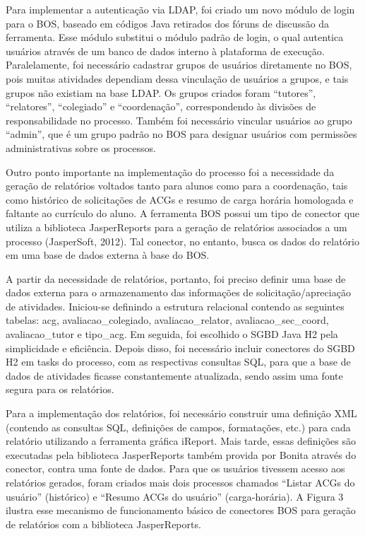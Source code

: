 \documentclass[12pt]{article}
\begin{document}
Para implementar a autenticação via LDAP, foi criado um novo módulo de login para o BOS, baseado em códigos Java retirados dos fóruns de discussão da ferramenta. Esse módulo substitui o módulo padrão de login, o qual autentica usuários através de um banco de dados interno à plataforma de execução. Paralelamente, foi necessário cadastrar grupos de usuários diretamente no BOS, pois muitas atividades dependiam dessa vinculação de usuários a grupos, e tais grupos não existiam na base LDAP. Os grupos criados foram “tutores”, “relatores”, “colegiado” e “coordenação”, correspondendo às divisões de responsabilidade no processo. Também foi necessário vincular usuários ao grupo “admin”, que é um grupo padrão no BOS para designar usuários com permissões administrativas sobre os processos.

Outro ponto importante na implementação do processo foi a necessidade da geração de relatórios voltados tanto para alunos como para a coordenação, tais como histórico de solicitações de ACGs e resumo de carga horária homologada e faltante ao currículo do aluno. A ferramenta BOS possui um tipo de conector que utiliza a biblioteca JasperReports para a geração de relatórios associados a um processo (JasperSoft, 2012). Tal conector, no entanto, busca os dados do relatório em uma base de dados externa à base do BOS.

A partir da necessidade de relatórios, portanto, foi preciso definir uma base de dados externa para o armazenamento das informações de solicitação/apreciação de atividades. Iniciou-se definindo a estrutura relacional contendo as seguintes tabelas: acg, avaliacao\_colegiado, avaliacao\_relator, avaliacao\_sec\_coord, avaliacao\_tutor e tipo\_acg. Em seguida, foi escolhido o SGBD Java H2 pela simplicidade e eficiência. Depois disso, foi necessário incluir conectores do SGBD H2 em tasks do processo, com as respectivas consultas SQL, para que a base de dados de atividades ficasse constantemente atualizada, sendo assim uma fonte segura para os relatórios.

Para a implementação dos relatórios, foi necessário construir uma definição XML (contendo as consultas SQL, definições de campos, formatações, etc.)  para cada relatório utilizando a ferramenta gráfica iReport. Mais tarde, essas definições são executadas pela biblioteca JasperReports também provida por Bonita através do conector, contra uma fonte de dados. Para que os usuários tivessem acesso aos relatórios gerados, foram criados mais dois processos chamados “Listar ACGs do usuário” (histórico) e “Resumo ACGs do usuário” (carga-horária). A Figura 3 ilustra esse mecanismo de funcionamento básico de conectores BOS para geração de relatórios com a biblioteca JasperReports.
\end{document}
